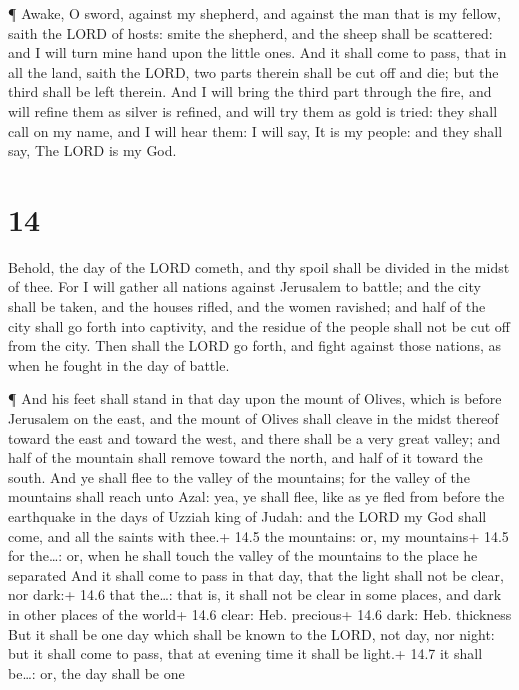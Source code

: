  ¶ Awake, O sword, against my shepherd, and against the man
that is my fellow, saith the LORD of hosts: smite the shepherd, and the
sheep shall be scattered: and I will turn mine hand upon the little
ones.  And it shall come to pass, that in all the land,
saith the LORD, two parts therein shall be cut off and die; but the
third shall be left therein.  And I will bring the third
part through the fire, and will refine them as silver is refined, and
will try them as gold is tried: they shall call on my name, and I will
hear them: I will say, It is my people: and they shall say, The LORD is
my God.

\hypertarget{section-13}{%
\section{14}\label{section-13}}

 Behold, the day of the LORD cometh, and thy spoil shall be
divided in the midst of thee.  For I will gather all nations
against Jerusalem to battle; and the city shall be taken, and the houses
rifled, and the women ravished; and half of the city shall go forth into
captivity, and the residue of the people shall not be cut off from the
city.  Then shall the LORD go forth, and fight against those
nations, as when he fought in the day of battle.

 ¶ And his feet shall stand in that day upon the mount of
Olives, which is before Jerusalem on the east, and the mount of Olives
shall cleave in the midst thereof toward the east and toward the west,
and there shall be a very great valley; and half of the mountain shall
remove toward the north, and half of it toward the south. 
And ye shall flee to the valley of the mountains; for the valley of the
mountains shall reach unto Azal: yea, ye shall flee, like as ye fled
from before the earthquake in the days of Uzziah king of Judah: and the
LORD my God shall come, and all the saints with thee.+ 14.5 the
mountains: or, my mountains+ 14.5 for the\ldots: or, when he shall touch
the valley of the mountains to the place he separated  And
it shall come to pass in that day, that the light shall not be clear,
nor dark:+ 14.6 that the\ldots: that is, it shall not be clear in some
places, and dark in other places of the world+ 14.6 clear: Heb.
precious+ 14.6 dark: Heb. thickness  But it shall be one day
which shall be known to the LORD, not day, nor night: but it shall come
to pass, that at evening time it shall be light.+ 14.7 it shall
be\ldots: or, the day shall be one


